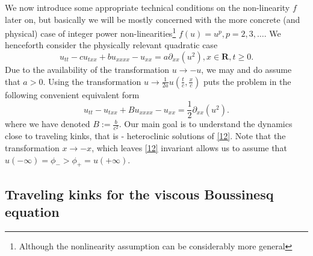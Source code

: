 \documentclass[12pt]{amsart}
\theoremstyle{definition}
\theoremstyle{remark}
\numberwithin{equation}{section}
\renewcommand{\(}{\left(}
\renewcommand{\)}{\right)}
\renewcommand{\[}{\left[}
\renewcommand{\]}{\right]}
\newcommand{\f}[2]{\frac{#1}{#2}}
\newcommand{\rone}{\mathbf R}
\newcommand{\p}{\partial}
\begin{document}
  We now introduce some appropriate technical conditions on the non-linearity $f$ later on, but basically 
  we will be mostly concerned  with  the more concrete (and physical) case of integer power non-linearities\footnote{Although the nonlinearity assumption can be considerably more general} $f(u)=u^p, p=2, 3, \ldots$.  
We henceforth consider the physically relevant quadratic case 
    \begin{equation}
  	\label{11} 
  		u_{tt} - c u_{txx}+ b u_{xxxx} - u_{xx}=a \p_{xx} (u^2),  x\in \rone, t\geq 0.
  \end{equation}
Due to the availability of the transformation $u\to -u$, we may and do  assume that $a>0$. Using the transformation $u\to \f{1}{2a} u\left(\f{t}{c}, \f{x}{c}\right)$ puts the problem in the following convenient equivalent form 
 \begin{equation}
	\label{12} 
	u_{tt} - u_{txx}+ B u_{xxxx} - u_{xx}= \f{1}{2} \p_{xx} (u^2).
\end{equation}
where we have  denoted $B:=\f{b}{c^2}$. 
Our main goal is to understand the dynamics close to traveling kinks, that is - heteroclinic solutions of \eqref{12}. Note that the transformation $x\to -x$, which leaves \eqref{12} invariant allows us to assume that $u(-\infty)=\phi_->\phi_+=u(+\infty)$. 
\subsection{Traveling kinks for the viscous Boussinesq equation}
\end{document}
